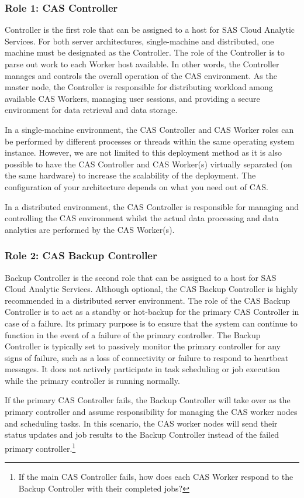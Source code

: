 \subsubsection{Role 1: CAS Controller}
Controller is the first role that can be assigned to a host for SAS Cloud Analytic Services. For both server architectures, single-machine and distributed, one machine must be designated as the Controller. The role of the Controller is to parse out work to each Worker host available. In other words, the Controller manages and controls the overall operation of the CAS environment. As the master node, the Controller is responsible for distributing workload among available CAS Workers, managing user sessions, and providing a secure environment for data retrieval and data storage. 

In a single-machine environment, the CAS Controller and CAS Worker roles can be performed by different processes or threads within the same operating system instance. However, we are not limited to this deployment method as it is also possible to have the CAS Controller and CAS Worker(s) virtually separated (on the same hardware) to increase the scalability of the deployment. The configuration of your architecture depends on what you need out of CAS.  

In a distributed environment, the CAS Controller is responsible for managing and controlling the CAS environment whilst the actual data processing and data analytics are performed by the CAS Worker(s).

\subsubsection{Role 2: CAS Backup Controller}
Backup Controller is the second role that can be assigned to a host for SAS Cloud Analytic Services. Although optional, the CAS Backup Controller is highly recommended in a distributed server environment. The role of the CAS Backup Controller is to act as a standby or hot-backup for the primary CAS Controller in case of a failure. Its primary purpose is to ensure that the system can continue to function in the event of a failure of the primary controller. The Backup Controller is typically set to passively monitor the primary controller for any signs of failure, such as a loss of connectivity or failure to respond to heartbeat messages. It does not actively participate in task scheduling or job execution while the primary controller is running normally. 

If the primary CAS Controller fails, the Backup Controller will take over as the primary controller and assume responsibility for managing the CAS worker nodes and scheduling tasks. In this scenario, the CAS worker nodes will send their status updates and job results to the Backup Controller instead of the failed primary controller.\footnote{If the main CAS Controller fails, how does each CAS Worker respond to the Backup Controller with their completed jobs?}

